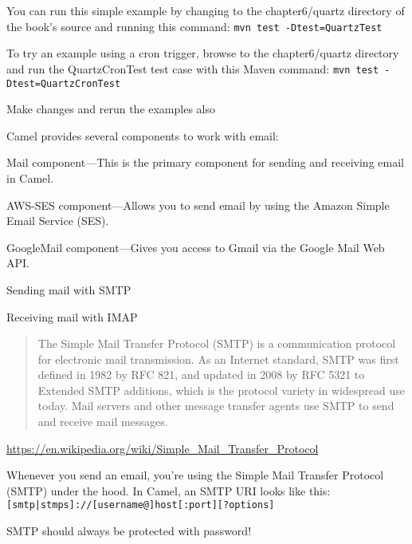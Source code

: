 \documentclass[Screen16to9,17pt]{foils}
\begin{document}
You can run this simple example by changing to the chapter6/quartz directory of
the book’s source and running this command:
\verb+mvn test -Dtest=QuartzTest+

To try an example using a cron trigger, browse to the chapter6/quartz directory and
run the QuartzCronTest test case with this Maven command:
\verb+mvn test -Dtest=QuartzCronTest+

\vskip 2cm
\centerline{Make changes and rerun the examples also}



Camel provides several components to work with email:
\begin{list2}
\item Mail component—This is the primary component for sending and receiving email
in Camel.
\item  AWS-­SES component—Allows you to send email by using the Amazon Simple Email
Service (SES).
\item GoogleMail component—Gives you access to Gmail via the Google Mail Web API.
\end{list2}


\begin{list2}
\item Sending mail with SMTP
\item  Receiving mail with IMAP
\end{list2}



\begin{quote}
  The Simple Mail Transfer Protocol (SMTP) is a communication protocol for electronic mail transmission. As an Internet standard, SMTP was first defined in 1982 by RFC 821, and updated in 2008 by RFC 5321 to Extended SMTP additions, which is the protocol variety in widespread use today. Mail servers and other message transfer agents use SMTP to send and receive mail messages.
\end{quote}

\url{https://en.wikipedia.org/wiki/Simple_Mail_Transfer_Protocol}


Whenever you send an email, you’re using the Simple Mail Transfer Protocol (SMTP)
under the hood. In Camel, an SMTP URI looks like this:
\verb+[smtp|stmps]://[username@]host[:port][?options]+


SMTP should always be protected with password!
\end{document}
